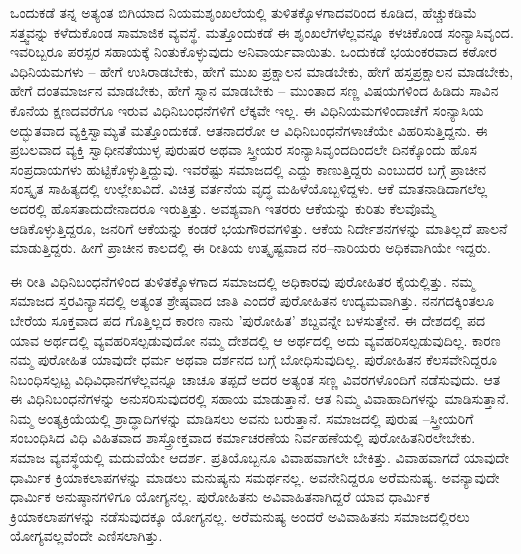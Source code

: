 ಒಂದುಕಡೆ ತನ್ನ ಅತ್ಯಂತ ಬಿಗಿಯಾದ ನಿಯಮಶೃಂಖಲೆಯಲ್ಲಿ ತುಳಿತಕ್ಕೊಳಗಾದವರಿಂದ ಕೂಡಿದ, ಹೆಚ್ಚುಕಡಿಮೆ ಸತ್ತ್ವವನ್ನು ಕಳೆದುಕೊಂಡ ಸಾಮಾಜಿಕ ವ್ಯವಸ್ಥೆ. ಮತ್ತೊಂದುಕಡೆ ಈ ಶೃಂಖಲೆಗಳೆಲ್ಲವನ್ನೂ ಕಳಚಿಕೊಂಡ ಸಂನ್ಯಾಸಿವೃಂದ. ಇವರಿಬ್ಬರೂ ಪರಸ್ಪರ ಸಹಾಯಕ್ಕೆ ನಿಂತುಕೊಳ್ಳುವುದು ಅನಿವಾರ್ಯವಾಯಿತು. ಒಂದುಕಡೆ ಭಯಂಕರವಾದ ಕಠೋರ ವಿಧಿನಿಯಮಗಳು – ಹೇಗೆ ಉಸಿರಾಡಬೇಕು, ಹೇಗೆ ಮುಖ ಪ್ರಕ್ಷಾಲನ ಮಾಡಬೇಕು, ಹೇಗೆ ಹಸ್ತಪ್ರಕ್ಷಾಲನ ಮಾಡಬೇಕು, ಹೇಗೆ ದಂತಮಾರ್ಜನ ಮಾಡಬೇಕು, ಹೇಗೆ ಸ್ನಾನ ಮಾಡಬೇಕು – ಮುಂತಾದ ಸಣ್ಣ ವಿಷಯಗಳಿಂದ ಹಿಡಿದು ಸಾವಿನ ಕೊನೆಯ ಕ್ಷಣದವರೆಗೂ ಇರುವ ವಿಧಿನಿಬಂಧನೆಗಳಿಗೆ ಲೆಕ್ಕವೇ ಇಲ್ಲ. ಈ ವಿಧಿನಿಯಮಗಳಿಂದಾಚೆಗೆ ಸಂನ್ಯಾಸಿಯ ಅದ್ಭುತವಾದ ವ್ಯಕ್ತಿಸ್ವಾಮ್ಯತೆ ಮತ್ತೊಂದುಕಡೆ. ಆತನಾದರೋ ಆ ವಿಧಿನಿಬಂಧನೆಗಳಾಚೆಯೇ ವಿಹರಿಸುತ್ತಿದ್ದನು. ಈ ಪ್ರಬಲವಾದ ವ್ಯಕ್ತಿ ಸ್ವಾಧೀನತೆಯುಳ್ಳ ಪುರುಷರ ಅಥವಾ ಸ್ತ್ರೀಯರ ಸಂನ್ಯಾಸಿವೃಂದದಿಂದಲೇ ದಿನಕ್ಕೊಂದು ಹೊಸ ಸಂಪ್ರದಾಯಗಳು ಹುಟ್ಟಿಕೊಳ್ಳುತ್ತಿದ್ದುವು. ಇವರೆಷ್ಟು ಸಮಾಜದಲ್ಲಿ ಎದ್ದು ಕಾಣುತ್ತಿದ್ದರು ಎಂಬುದರ ಬಗ್ಗೆ ಪ್ರಾಚೀನ ಸಂಸ್ಕೃತ ಸಾಹಿತ್ಯದಲ್ಲಿ ಉಲ್ಲೇಖವಿದೆ. ವಿಚಿತ್ರ ವರ್ತನೆಯ ವೃದ್ಧ ಮಹಿಳೆಯೊಬ್ಬಳಿದ್ದಳು. ಆಕೆ ಮಾತನಾಡಿದಾಗಲೆಲ್ಲ ಅದರಲ್ಲಿ ಹೊಸತಾದುದೇನಾದರೂ ಇರುತ್ತಿತ್ತು. ಅವಶ್ಯವಾಗಿ ಇತರರು ಆಕೆಯನ್ನು ಕುರಿತು ಕೆಲವೊಮ್ಮೆ ಆಡಿಕೊಳ್ಳುತ್ತಿದ್ದರೂ, ಜನರಿಗೆ ಆಕೆಯನ್ನು ಕಂಡರೆ ಭಯಗೌರವಗಳಿತ್ತು. ಆಕೆಯ ನಿರ್ದೇಶನಗಳನ್ನು ಮಾತಿಲ್ಲದೆ ಪಾಲನೆ ಮಾಡುತ್ತಿದ್ದರು. ಹೀಗೆ ಪ್ರಾಚೀನ ಕಾಲದಲ್ಲಿ ಈ ರೀತಿಯ ಉತ್ಕೃಷ್ಟವಾದ ನರ–ನಾರಿಯರು ಅಧಿಕವಾಗಿಯೇ ಇದ್ದರು.

ಈ ರೀತಿ ವಿಧಿನಿಬಂಧನೆಗಳಿಂದ ತುಳಿತಕ್ಕೊಳಗಾದ ಸಮಾಜದಲ್ಲಿ ಅಧಿಕಾರವು ಪುರೋಹಿತರ ಕೈಯಲ್ಲಿತ್ತು. ನಮ್ಮ ಸಮಾಜದ ಸ್ತರವಿನ್ಯಾಸದಲ್ಲಿ ಅತ್ಯಂತ ಶ್ರೇಷ್ಠವಾದ ಜಾತಿ ಎಂದರೆ ಪುರೋಹಿತನ ಉದ್ಯಮವಾಗಿತ್ತು. ನನಗದಕ್ಕಿಂತಲೂ ಬೇರೆಯ ಸೂಕ್ತವಾದ ಪದ ಗೊತ್ತಿಲ್ಲದ ಕಾರಣ ನಾನು 'ಪುರೋಹಿತ' ಶಬ್ದವನ್ನೇ ಬಳಸುತ್ತೇನೆ. ಈ ದೇಶದಲ್ಲಿ  ಪದ ಯಾವ ಅರ್ಥದಲ್ಲಿ ವ್ಯವಹರಿಸಲ್ಪಡುವುದೋ ನಮ್ಮ ದೇಶದಲ್ಲಿ ಆ ಅರ್ಥದಲ್ಲಿ ಅದು ವ್ಯವಹರಿಸಲ್ಪಡುವುದಿಲ್ಲ. ಕಾರಣ ನಮ್ಮ ಪುರೋಹಿತ ಯಾವುದೇ ಧರ್ಮ ಅಥವಾ ದರ್ಶನದ ಬಗ್ಗೆ ಬೋಧಿಸುವುದಿಲ್ಲ. ಪುರೋಹಿತನ ಕೆಲಸವೇನಿದ್ದರೂ ನಿಬಂಧಿಸಲ್ಪಟ್ಟ ವಿಧಿವಿಧಾನಗಳೆಲ್ಲವನ್ನೂ ಚಾಚೂ ತಪ್ಪದೆ ಅದರ ಅತ್ಯಂತ ಸಣ್ಣ ವಿವರಗಳೊಂದಿಗೆ ನಡೆಸುವುದು. ಆತ ಈ ವಿಧಿನಿಬಂಧನೆಗಳನ್ನು ಅನುಸರಿಸುವುದರಲ್ಲಿ ಸಹಾಯ ಮಾಡುತ್ತಾನೆ. ಆತ ನಿಮ್ಮ ವಿವಾಹಾದಿಗಳನ್ನು ಮಾಡಿಸುತ್ತಾನೆ. ನಿಮ್ಮ ಅಂತ್ಯಕ್ರಿಯೆಯಲ್ಲಿ ಶ್ರಾದ್ಧಾದಿಗಳನ್ನು ಮಾಡಿಸಲು ಅವನು ಬರುತ್ತಾನೆ. ಸಮಾಜದಲ್ಲಿ ಪುರುಷ –ಸ್ತ್ರೀಯರಿಗೆ ಸಂಬಂಧಿಸಿದ ವಿಧಿ ವಿಹಿತವಾದ ಶಾಸ್ತ್ರೋಕ್ತವಾದ ಕರ್ಮಾಚರಣೆಯ ನಿರ್ವಹಣೆಯಲ್ಲಿ ಪುರೋಹಿತನಿರಲೇಬೇಕು. ಸಮಾಜ ವ್ಯವಸ್ಥೆಯಲ್ಲಿ ಮದುವೆಯೇ ಆದರ್ಶ. ಪ್ರತಿಯೊಬ್ಬನೂ ವಿವಾಹವಾಗಲೇ ಬೇಕಿತ್ತು. ವಿವಾಹವಾಗದೆ ಯಾವುದೇ ಧಾರ್ಮಿಕ ಕ್ರಿಯಾಕಲಾಪಗಳನ್ನು ಮಾಡಲು ಮನುಷ್ಯನು ಸಮರ್ಥನಲ್ಲ. ಅವನೇನಿದ್ದರೂ ಅರೆಮನುಷ್ಯ. ಅವನ್ಯಾವುದೇ ಧಾರ್ಮಿಕ ಅನುಷ್ಠಾನಗಳಿಗೂ ಯೋಗ್ಯನಲ್ಲ. ಪುರೋಹಿತನು ಅವಿವಾಹಿತನಾಗಿದ್ದರೆ ಯಾವ ಧಾರ್ಮಿಕ ಕ್ರಿಯಾಕಲಾಪಗಳನ್ನು ನಡೆಸುವುದಕ್ಕೂ ಯೋಗ್ಯನಲ್ಲ. ಅರೆಮನುಷ್ಯ ಅಂದರೆ ಅವಿವಾಹಿತನು ಸಮಾಜದಲ್ಲಿರಲು ಯೋಗ್ಯವಲ್ಲವೆಂದೇ ಎಣಿಸಲಾಗಿತ್ತು.

